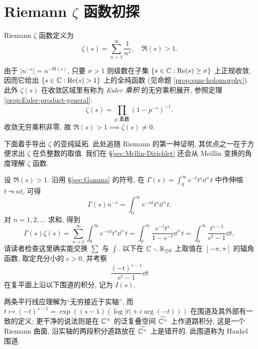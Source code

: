 \section{Riemann \texorpdfstring{$\zeta$}{zeta} 函数初探}\label{sec:Riemann-zeta}
\begin{definition} 
	Riemann $\zeta$ 函数定义为
	\[ \zeta(s) = \sum_{n=1}^\infty \frac{1}{n^s}, \quad \Re(s) > 1. \]
\end{definition}
由于 $\left| n^{-s} \right| = n^{-\Re(s)}$, 只要 $\sigma > 1$ 则级数在子集 $\{s \in \mathbb{C}: \operatorname{Re}(s) \geq \sigma \}$ 上正规收敛, 因而它给出 $\{s \in \mathbb{C} : \operatorname{Re}(s) > 1 \}$ 上的全纯函数 (见命题 \ref{prop:sum-holomorphy}). 此外 $\zeta(s)$ 在收敛区域里有称为 \emph{Euler 乘积} 的无穷乘积展开, 参照定理 \ref{prop:Euler-product-general}: 
\begin{equation}\label{eqn:zeta-Euler-prod}
	\zeta(s) = \prod_{p: \text{素数}} (1-p^{-s})^{-1}.
\end{equation}
收敛无穷乘积非零, 故 $\Re(s) > 1 \implies \zeta(s) \neq 0$.

下面着手导出 $\zeta$ 的亚纯延拓. 此处追随 Riemann 的第一种证明, 其优点之一在于方便求出 $\zeta$ 在负整数的取值. 我们在 \S\ref{sec:Mellin-Dirichlet} 还会从 Meillin 变换的角度理解 $\zeta$ 函数.

设 $\Re(s) > 1$. 沿用 \S\ref{sec:Gamma} 的符号, 在 $\Gamma(s) = \int_0^\infty e^{-t} t^s \dd^\times t$ 中作伸缩 $t \leadsto nt$, 可得
\[ \Gamma(s) n^{-s} = \int_0^\infty e^{-nt} t^s \dd^\times t. \]
对 $n=1,2,\ldots$ 求和, 得到
\[ \Gamma(s) \zeta(s) = \sum_{n=1}^\infty \int_0^\infty e^{-nt} t^s \dd^\times t = \int_0^\infty \frac{e^{-t} t^s}{1 - e^{-t}} \dd^\times t = \int_0^\infty \frac{t^{s-1}}{e^t - 1} \dd t, \]
请读者检查这里确实能交换 $\sum$ 与 $\int$. 以下在 $\mathbb{C} \smallsetminus \mathbb{R}_{\leq 0}$ 上取值在 $[-\pi, \pi]$ 的辐角函数, 取定充分小的 $\epsilon > 0$, 并考察
\[ \frac{(-t)^{s-1}}{e^t - 1} \dd t \]
在复平面上沿以下围道的积分, 记为 $I(s)$.
\begin{center}\end{center}
两条平行线应理解为``无穷接近于实轴'', 而 $t \mapsto (-t)^{s-1} = \exp\left((s-1) (\log|t| + i\arg(-t))\right)$ 在围道及其外部有一致的定义; 更干净的说法则是在 $\mathbb{C}^\times$ 的泛复叠空间 $\widetilde{\mathbb{C}^\times}$ 上作道路积分, 这是一个 Riemann 曲面, 沿实轴的两段积分道路放在 $\widetilde{\mathbb{C}^\times}$ 上是错开的. 此围道称为 Hankel 围道.

